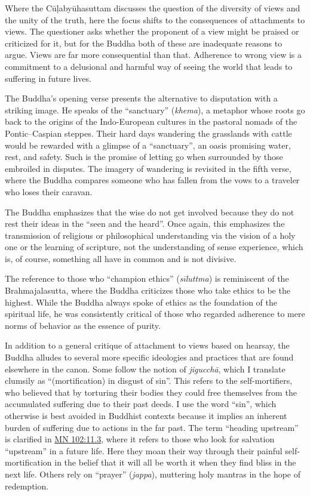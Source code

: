 \documentclass[12pt,openany]{book}%
\begin{document}
Where the \textsanskrit{Cūḷabyūhasuttam} discusses the question of the diversity of views and the unity of the truth, here the focus shifts to the consequences of attachments to views. The questioner asks whether the proponent of a view might be praised or criticized for it, but for the Buddha both of these are inadequate reasons to argue. Views are far more consequential than that. Adherence to wrong view is a commitment to a delusional and harmful way of seeing the world that leads to suffering in future lives.

The Buddha’s opening verse presents the alternative to disputation with a striking image. He speaks of the “sanctuary” (\textit{khema}), a metaphor whose roots go back to the origins of the Indo-European cultures in the pastoral nomads of the Pontic–Caspian steppes. Their hard days wandering the grasslands with cattle would be rewarded with a glimpse of a “sanctuary”, an oasis promising water, rest, and safety. Such is the promise of letting go when surrounded by those embroiled in disputes. The imagery of wandering is revisited in the fifth verse, where the Buddha compares someone who has fallen from the vows to a traveler who loses their caravan.

The Buddha emphasizes that the wise do not get involved because they do not rest their ideas in the “seen and the heard”. Once again, this emphasizes the transmission of religious or philosophical understanding via the vision of a holy one or the learning of scripture, not the understanding of sense experience, which is, of course, something all have in common and is not divisive.

The reference to those who “champion ethics” (\textit{\textsanskrit{sīluttma}}) is reminiscent of the Brahmajalasutta, where the Buddha criticizes those who take ethics to be the highest. While the Buddha always spoke of ethics as the foundation of the spiritual life, he was consistently critical of those who regarded adherence to mere norms of behavior as the essence of purity.

In addition to a general critique of attachment to views based on hearsay, the Buddha alludes to several more specific ideologies and practices that are found elsewhere in the canon. Some follow the notion of \textit{\textsanskrit{jigucchā}}, which I translate clumsily as “(mortification) in disgust of sin”. This refers to the self-mortifiers, who believed that by torturing their bodies they could free themselves from the accumulated suffering due to their past deeds. I use the word “sin”, which otherwise is best avoided in Buddhist contexts because it implies an inherent burden of suffering due to actions in the far past. The term “heading upstream” is clarified in \href{https://suttacentral.net/mn102/en/sujato\#11.3}{MN 102:11.3}, where it refers to those who look for salvation “upstream” in a future life. Here they moan their way through their painful self-mortification in the belief that it will all be worth it when they find bliss in the next life. Others rely on “prayer” (\textit{jappa}), muttering holy mantras in the hope of redemption.
\end{document}
